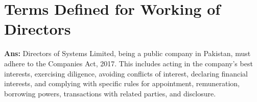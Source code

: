 \documentclass{article}
\begin{document}
\section{Terms Defined for Working of Directors}
\textbf{Ans:} Directors of Systems Limited, being a public company in Pakistan, must adhere to the Companies Act, 2017. This includes acting in the company's best interests, exercising diligence, avoiding conflicts of interest, declaring financial interests, and complying with specific rules for appointment, remuneration, borrowing powers, transactions with related parties, and disclosure.
\end{document}
